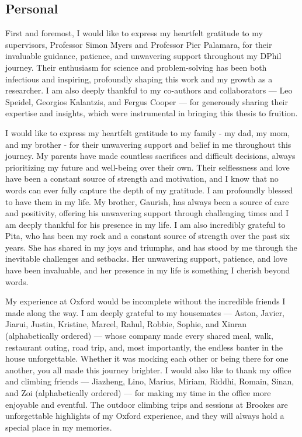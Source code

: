 \subsection*{Personal}

First and foremost, I would like to express my heartfelt gratitude to my supervisors, Professor Simon Myers and Professor Pier Palamara, for their invaluable guidance, patience, and unwavering support throughout my DPhil journey. Their enthusiasm for science and problem-solving has been both infectious and inspiring, profoundly shaping this work and my growth as a researcher. I am also deeply thankful to my co-authors and collaborators — Leo Speidel, Georgios Kalantzis, and Fergus Cooper — for generously sharing their expertise and insights, which were instrumental in bringing this thesis to fruition.

I would like to express my heartfelt gratitude to my family - my dad, my mom, and my brother - for their unwavering support and belief in me throughout this journey. My parents have made countless sacrifices and difficult decisions, always prioritizing my future and well-being over their own. Their selflessness and love have been a constant source of strength and motivation, and I know that no words can ever fully capture the depth of my gratitude. I am profoundly blessed to have them in my life. My brother, Gaurish, has always been a source of care and positivity, offering his unwavering support through challenging times and I am deeply thankful for his presence in my life. I am also incredibly grateful to Pita, who has been my rock and a constant source of strength over the past six years. She has shared in my joys and triumphs, and has stood by me through the inevitable challenges and setbacks. Her unwavering support, patience, and love have been invaluable, and her presence in my life is something I cherish beyond words.

My experience at Oxford would be incomplete without the incredible friends I made along the way. I am deeply grateful to my housemates — Aston, Javier, Jiarui, Justin, Kristine, Marcel, Rahul, Robbie, Sophie, and Xinran (alphabetically ordered) — whose company made every shared meal, walk, restaurant outing, road trip, and, most importantly, the endless banter in the house unforgettable. Whether it was mocking each other or being there for one another, you all made this journey brighter. I would also like to thank my office and climbing friends — Jiazheng, Lino, Marius, Miriam, Riddhi, Romain, Sinan, and Zoi (alphabetically ordered) — for making my time in the office more enjoyable and eventful. The outdoor climbing trips and sessions at Brookes are unforgettable highlights of my Oxford experience, and they will always hold a special place in my memories.


